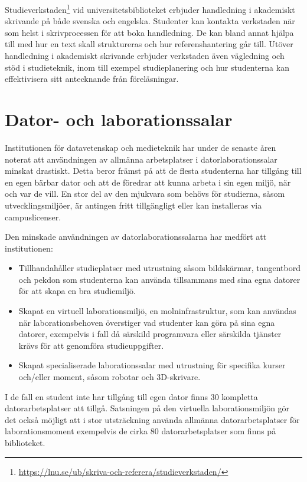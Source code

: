 Studieverkstaden\footnote{\url{https://lnu.se/ub/skriva-och-referera/studieverkstaden/}} vid universitetsbiblioteket erbjuder handledning i akademiskt skrivande på både svenska och engelska. Studenter kan kontakta verkstaden när som helst i skrivprocessen för att boka handledning. De kan bland annat hjälpa till med hur en text skall struktureras och hur referenshantering går till. Utöver handledning i akademiskt skrivande erbjuder verkstaden även vägledning och stöd i studieteknik, inom till exempel studieplanering och hur studenterna kan effektivisera sitt antecknande från föreläsningar.

\section{Dator- och laborationssalar}

Institutionen för datavetenskap och medieteknik har under de senaste åren noterat att användningen av allmänna arbetsplatser i datorlaborationssalar minskat drastiskt. Detta beror främst på att de flesta studenterna har tillgång till en egen bärbar dator och att de föredrar att kunna arbeta i sin egen miljö, när och var de vill. En stor del av den mjukvara som behövs för studierna, såsom utvecklingsmiljöer, är antingen fritt tillgängligt eller kan installeras via campuslicenser.

Den minskade användningen av datorlaborationssalarna har medfört att institutionen:

\begin{itemize}
\item Tillhandahåller studieplatser med utrustning såsom bildskärmar, tangentbord och pekdon som studenterna kan använda tillsammans med sina egna datorer för att skapa en bra studiemiljö.
\item Skapat en virtuell laborationsmiljö, en molninfrastruktur, som kan användas när laborationsbehoven överstiger vad studenter kan göra på sina egna datorer, exempelvis i fall då särskild programvara eller särskilda tjänster krävs för att genomföra studieuppgifter.
\item Skapat specialiserade laborationssalar med utrustning för specifika kurser och/eller moment, såsom robotar och 3D-skrivare.
\end{itemize}

I de fall en student inte har tillgång till egen dator finns 30 kompletta datorarbetsplatser att tillgå. Satsningen på den virtuella laborationsmiljön gör det också möjligt att i stor utsträckning använda allmänna datorarbetsplatser för laborationsmoment exempelvis de cirka 80 datorarbetsplatser som finns på biblioteket.

